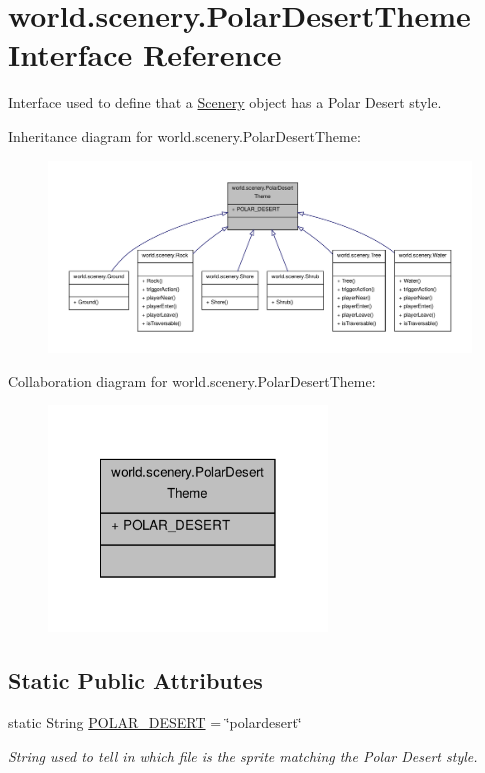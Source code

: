 \hypertarget{a00019}{\section{world.\-scenery.\-Polar\-Desert\-Theme Interface Reference}
\label{a00019}
}


Interface used to define that a \hyperlink{a00024}{Scenery} object has a Polar Desert style.  




Inheritance diagram for world.\-scenery.\-Polar\-Desert\-Theme\-:
\nopagebreak
\begin{figure}[H]
\begin{center}
\leavevmode
\includegraphics[width=350pt]{a00167}
\end{center}
\end{figure}


Collaboration diagram for world.\-scenery.\-Polar\-Desert\-Theme\-:
\nopagebreak
\begin{figure}[H]
\begin{center}
\leavevmode
\includegraphics[width=210pt]{a00168}
\end{center}
\end{figure}
\subsection*{Static Public Attributes}
\begin{DoxyCompactItemize}
\item 
static String \hyperlink{a00019_a48dd1801e0146ea2306dadcbdee81b77}{P\-O\-L\-A\-R\-\_\-\-D\-E\-S\-E\-R\-T} = \char`\"{}polardesert\char`\"{}
\begin{DoxyCompactList}\small\item\em String used to tell in which file is the sprite matching the Polar Desert style. \end{DoxyCompactList}\end{DoxyCompactItemize}


